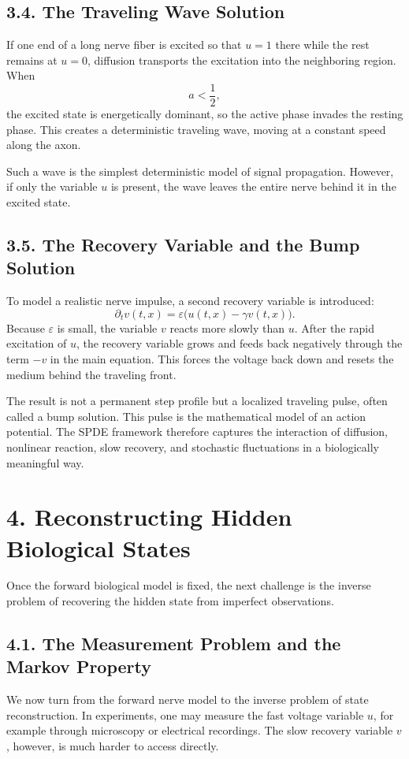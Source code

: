 \documentclass[11pt]{article}
\theoremstyle{definition}
\theoremstyle{remark}
\begin{document}
\subsection*{3.4. The Traveling Wave Solution}
If one end of a long nerve fiber is excited so that \(u=1\) there while the rest remains at \(u=0\), diffusion transports the excitation into the neighboring region. When
\[
a<\frac12,
\]
the excited state is energetically dominant, so the active phase invades the resting phase. This creates a deterministic traveling wave, moving at a constant speed along the axon.

Such a wave is the simplest deterministic model of signal propagation. However, if only the variable \(u\) is present, the wave leaves the entire nerve behind it in the excited state.

\subsection*{3.5. The Recovery Variable and the Bump Solution}
To model a realistic nerve impulse, a second recovery variable is introduced:
\[
\partial_t v(t,x)=\varepsilon\bigl(u(t,x)-\gamma v(t,x)\bigr).
\]
Because \(\varepsilon\) is small, the variable \(v\) reacts more slowly than \(u\). After the rapid excitation of \(u\), the recovery variable grows and feeds back negatively through the term \(-v\) in the main equation. This forces the voltage back down and resets the medium behind the traveling front.

The result is not a permanent step profile but a localized traveling pulse, often called a bump solution. This pulse is the mathematical model of an action potential. The SPDE framework therefore captures the interaction of diffusion, nonlinear reaction, slow recovery, and stochastic fluctuations in a biologically meaningful way.

\section*{4. Reconstructing Hidden Biological States}
Once the forward biological model is fixed, the next challenge is the inverse problem of recovering the hidden state from imperfect observations.

\subsection*{4.1. The Measurement Problem and the Markov Property}
We now turn from the forward nerve model to the inverse problem of state reconstruction. In experiments, one may measure the fast voltage variable \(u\), for example through microscopy or electrical recordings. The slow recovery variable \(v\), however, is much harder to access directly.
\end{document}
